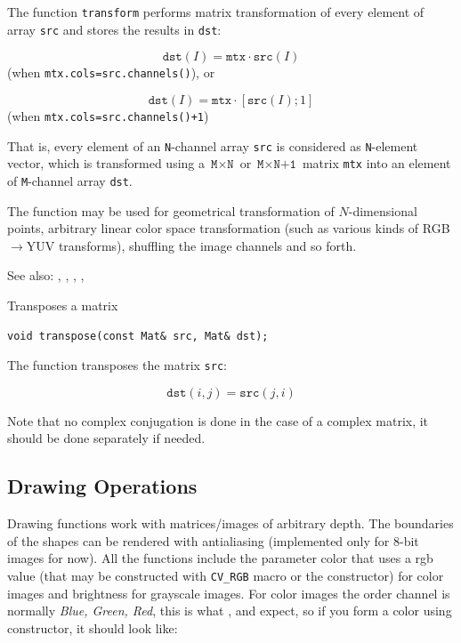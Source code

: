 The function \texttt{transform} performs matrix transformation of every element of array \texttt{src} and stores the results in \texttt{dst}:

\[
\texttt{dst}(I) = \texttt{mtx} \cdot \texttt{src}(I)
\]
(when \texttt{mtx.cols=src.channels()}), or

\[
\texttt{dst}(I) = \texttt{mtx} \cdot [\texttt{src}(I); 1]
\]
(when \texttt{mtx.cols=src.channels()+1})

That is, every element of an \texttt{N}-channel array \texttt{src} is
considered as \texttt{N}-element vector, which is transformed using
a $\texttt{M} \times \texttt{N}$ or $\texttt{M} \times \texttt{N+1}$ matrix \texttt{mtx} into
an element of \texttt{M}-channel array \texttt{dst}.

The function may be used for geometrical transformation of $N$-dimensional
points, arbitrary linear color space transformation (such as various kinds of RGB$\rightarrow$YUV transforms), shuffling the image channels and so forth.

See also: , , , , 

\label{transpose}
Transposes a matrix

\begin{lstlisting}
void transpose(const Mat& src, Mat& dst);
\end{lstlisting}
\begin{description}
\end{description}

The function  transposes the matrix \texttt{src}:

\[ \texttt{dst}(i,j) = \texttt{src}(j,i) \]

Note that no complex conjugation is done in the case of a complex
matrix, it should be done separately if needed.


\subsection{Drawing Operations}

Drawing functions work with matrices/images of arbitrary depth.
The boundaries of the shapes can be rendered with antialiasing (implemented only for 8-bit images for now).
All the functions include the parameter color that uses a rgb value (that may be constructed
with \texttt{CV\_RGB} macro or the  constructor) for color
images and brightness for grayscale images. For color images the order channel
is normally \emph{Blue, Green, Red}, this is what ,  and  expect,
so if you form a color using  constructor, it should look like:

